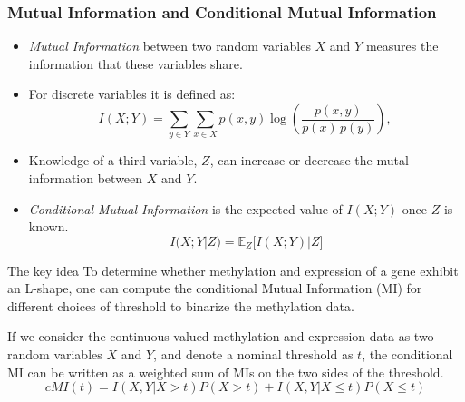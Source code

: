 \documentclass[handout]{beamer}
\begin{document}
\begin{frame}[allowframebreaks]
\frametitle{Mutual Information and Conditional Mutual Information}
\begin{itemize}
\item   \emph{Mutual Information} between two random variables $X$
and $Y$ measures the information that these variables share.
\item For discrete variables it is defined as:
\[
 I(X;Y)= \sum_{y \in Y} \sum_{x \in X}
                 p(x,y) \log{ \left(\frac{p(x,y)}{p(x)\,p(y)}
                              \right) }, \,\!
\]
\item Knowledge of a third variable, $Z$, can increase or decrease the mutal
information between $X$ and $Y$.
\item \emph{Conditional Mutual Information} is the expected value of $I(X;Y)$ once $Z$ is
known.
\[
I(X;Y|Z) = \mathbb E_Z \big[ I(X;Y)|Z\big ]
\]
\end{itemize}

\framebreak

\begin{block}{The key idea}
To determine whether methylation and expression of a gene exhibit an L-shape,
one can compute the conditional Mutual Information (MI) for different choices of threshold
to binarize the methylation data.
\end{block}
If we consider the continuous valued methylation and expression data as two random variables
$X$ and $Y$, and denote a nominal threshold as $t$, the conditional MI can be written as a
weighted sum of MIs on the two sides of the threshold.
\[
\mathit{cMI}(t)=I(X,Y|X>t) P(X>t) + I(X,Y|X\le t)P(X\le t)
\]
\end{frame}
\end{document}
